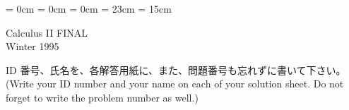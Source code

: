 

\topmargin = 0cm
\oddsidemargin = 0cm \evensidemargin = 0cm
\textheight = 23cm \textwidth = 15cm %


\begin{center}
{\gt\LARGE Calculus II  FINAL}\\
{\gt Winter 1995}
\end{center}

\noindent
ID 番号、氏名を、各解答用紙に、また、問題番号も忘れずに書いて下さい。\\
(Write your ID number and your name on each of your solution sheet. Do not forget to write the problem number as well.)

